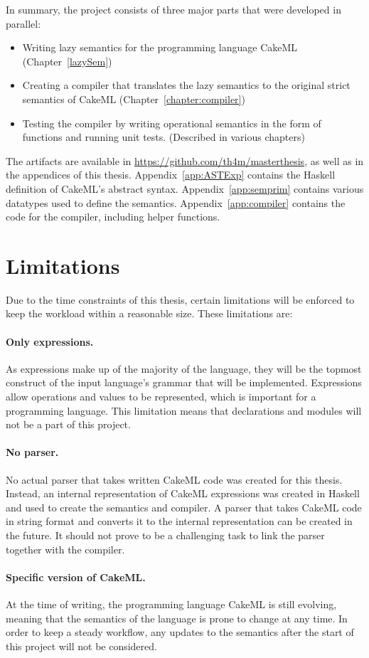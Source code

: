 In summary, the project consists of three major parts that were developed
in parallel:
\begin{itemize}
 \item Writing lazy semantics for the programming language CakeML (Chapter~\ref{lazySem})
 \item Creating a compiler that translates the lazy semantics to the original strict semantics of CakeML (Chapter~\ref{chapter:compiler})
 \item Testing the compiler by writing operational semantics in the form of functions and running unit tests. (Described in various chapters)
\end{itemize}

The artifacts are available in \url{https://github.com/th4m/masterthesis}, as
well as in the appendices of this thesis. Appendix~\ref{app:ASTExp} contains the
Haskell definition of CakeML's abstract syntax. Appendix~\ref{app:semprim}
contains various datatypes used to define the semantics.
Appendix~\ref{app:compiler} contains the code for the compiler, including helper
functions.

\section{Limitations}
\label{sec:limitations}
Due to the time constraints of this thesis, certain limitations will be enforced
to keep the workload within a reasonable size. These limitations are:

\paragraph{Only expressions.}
As expressions make up of the majority of the language, they will be the topmost
construct of the input language's grammar that will be implemented. Expressions
allow operations and values to be represented, which is important for a
programming language. This limitation means that declarations and modules will
not be a part of this project.

\paragraph{No parser.}
No actual parser that takes written CakeML code was created for this thesis.
Instead, an internal representation of CakeML expressions was created in
Haskell and used to create the semantics and compiler. A parser that
takes CakeML code in string format and converts it to the internal
representation can be created in the future. It should not prove to
be a challenging task to link the parser together with the compiler.

\paragraph{Specific version of CakeML.}
At the time of writing, the programming language CakeML is still evolving,
meaning that the semantics of the language is prone to change at
any time. In order to keep a steady workflow, any updates to the semantics after
the start of this project will not be considered.
